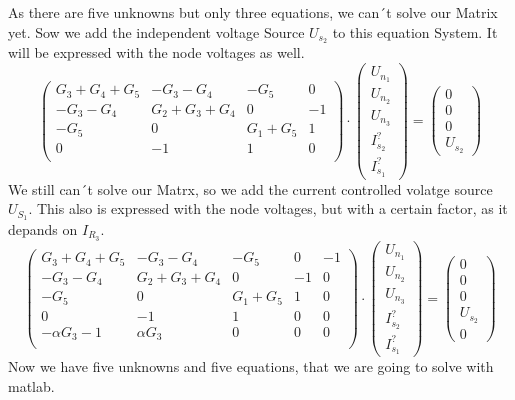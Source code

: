\documentclass[a4paper]{article}
\begin{document}
As there are five unknowns but only three equations, we can´t solve our Matrix yet.
Sow we add the independent voltage Source $U_{s_2}$ to this equation System. It will be expressed
with the node voltages as well.
\begin{equation}
      \begin{pmatrix}
            G_3 + G_4 + G_5 & -G_3 - G_4 & -G_5 & 0\\
            -G_3 -G_4 & G_2 + G_3 + G_4 & 0 & -1\\
            -G_5 & 0 & G_1 + G_5 & 1\\
            0 & -1 & 1 & 0\\
      \end{pmatrix}
      \cdot
      \begin{pmatrix}
            U_{n_1}\\U_{n_2}\\U_{n_3}\\I_{s_2}^?\\I_{s_1}^?
      \end{pmatrix}
      =
      \begin{pmatrix}
            0\\0\\0\\U_{s_2}
      \end{pmatrix}
\end{equation}
We still can´t solve our Matrx, so we add the current controlled volatge source $U_{S_1}$.
This also is expressed with the node voltages, but with a certain factor,
as it depands on $I_{R_3}$.
\begin{equation}
      \begin{pmatrix}
            G_3 + G_4 + G_5 & -G_3 - G_4 & -G_5 & 0 & -1\\
            -G_3 -G_4 & G_2 + G_3 + G_4 & 0 & -1 & 0\\
            -G_5 & 0 & G_1 + G_5 & 1 & 0\\
            0 & -1 & 1 & 0 & 0\\
            -\alpha G_3-1 & \alpha G_3 & 0 & 0 & 0\\
      \end{pmatrix}
      \cdot
      \begin{pmatrix}
            U_{n_1}\\U_{n_2}\\U_{n_3}\\I_{s_2}^?\\I_{s_1}^?
      \end{pmatrix}
      =
      \begin{pmatrix}
            0\\0\\0\\U_{s_2}\\0
      \end{pmatrix}
\end{equation}
Now we have five unknowns and five equations, that we are going to solve with matlab.
\clearpage
\end{document}
